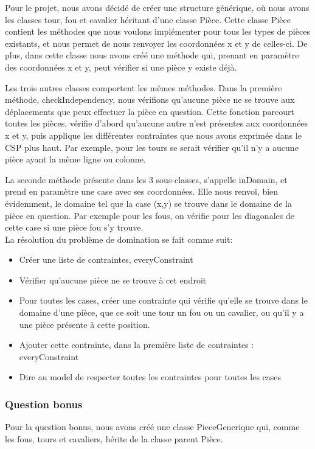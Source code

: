 \documentclass{article}
\begin{document}
Pour le projet, nous avons décidé de créer une structure générique, où nous avons les classes tour, fou et cavalier héritant d'une classe Pièce. 
Cette classe Pièce contient les méthodes que nous voulons implémenter pour tous les types de pièces existants, et nous permet de nous renvoyer les coordonnées x et y de celles-ci. De plus, dans cette classe nous avons créé une méthode qui, prenant en paramètre des coordonnées x et y, peut vérifier si une pièce y existe déjà. 

Les trois autres classes comportent les mêmes méthodes. Dans la première méthode, checkIndependency, nous vérifions qu'aucune pièce ne se trouve aux déplacements que peux effectuer la pièce en question. Cette fonction parcourt toutes les pièces, vérifie d'abord qu'aucune autre n'est présentes aux coordonnées x et y, puis applique les différentes contraintes que nous avons exprimée dans le CSP plus haut. Par exemple, pour les tours se serait vérifier qu'il n'y a aucune pièce ayant la même ligne ou colonne. 

La seconde méthode présente dans les 3 sous-classes, s'appelle inDomain, et prend en paramètre une case avec ses coordonnées. Elle nous renvoi, bien évidemment, le domaine tel que la case (x,y) se trouve dans le domaine de la pièce en question. Par exemple pour les fous, on vérifie pour les diagonales de cette case si une pièce fou s'y trouve.\\

La résolution du problème de domination se fait comme suit: 
\begin{itemize}
\item Créer une liste de contraintes, everyConstraint
\item Vérifier qu'aucune pièce ne se trouve à cet endroit
\item Pour toutes les cases, créer une contrainte qui vérifie qu'elle se trouve dans le domaine d'une pièce, que ce soit une tour un fou ou un cavalier, ou qu'il y a une pièce présente à cette position.
\item Ajouter cette contrainte, dans la première liste de contraintes : everyConstraint
\item Dire au model de respecter toutes les contraintes pour toutes les cases
\end{itemize}

\subsubsection{Question bonus}
Pour la question bonus, nous avons créé une classe PieceGenerique qui, comme les fous, tours et cavaliers, hérite de la classe parent Pièce.\\
\end{document}
